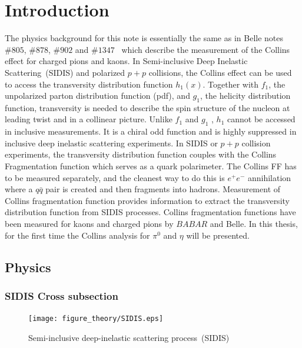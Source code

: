 \section{Introduction}
The physics background for this note is essentially the same as in Belle notes $\#805$, $\#878$, $\#902$ and $\#1347$~\cite{BelleNote1,BelleNote2,BelleNote3,BelleNote4} which describe the measurement of the Collins effect for charged pions and kaons. 
In Semi-inclusive Deep Inelastic Scattering~(SIDIS) and polarized $p+p$ collisions, the Collins effect can be used to access the transversity distribution function $h_1(x)$. Together with $f_1$, the unpolarized parton distribution function (pdf), and $g_1$, the helicity distribution function,  transversity is needed to describe the spin structure of the nucleon at leading twist and in a collinear picture. Unlike $f_1$ and $g_1$ , $h_1$ cannot be accessed in inclusive measurements. It is a chiral odd function and is highly suppressed in inclusive deep inelastic scattering experiments. In SIDIS or $p+p$ collision experiments, the transversity distribution function couples with the Collins Fragmentation function which serves as a quark polarimeter. The Collins FF has to be measured separately, and the cleanest way to do this is $e^+e^-$ annihilation where a $q\bar{q}$ pair is created and then fragments into hadrons. Measurement of Collins fragmentation function provides information to extract the transversity distribution function from SIDIS processes. Collins fragmentation functions have been measured for kaons and charged pions by $BABAR$ and Belle. In this thesis, for the first time the Collins analysis for $\pi^{0}$ and $\eta$ will be presented. 
%

\subsection{Physics}
\subsubsection{SIDIS Cross subsection}
\label{sec:SIDIScrosssubsection}
\begin{figure}[ht]
  \centering
  \texttt{[image: figure\_theory/SIDIS.eps]}
  \caption{Semi-inclusive deep-inelastic scattering process~(SIDIS)}
  \label{fig:SIDIS}
\end{figure}

